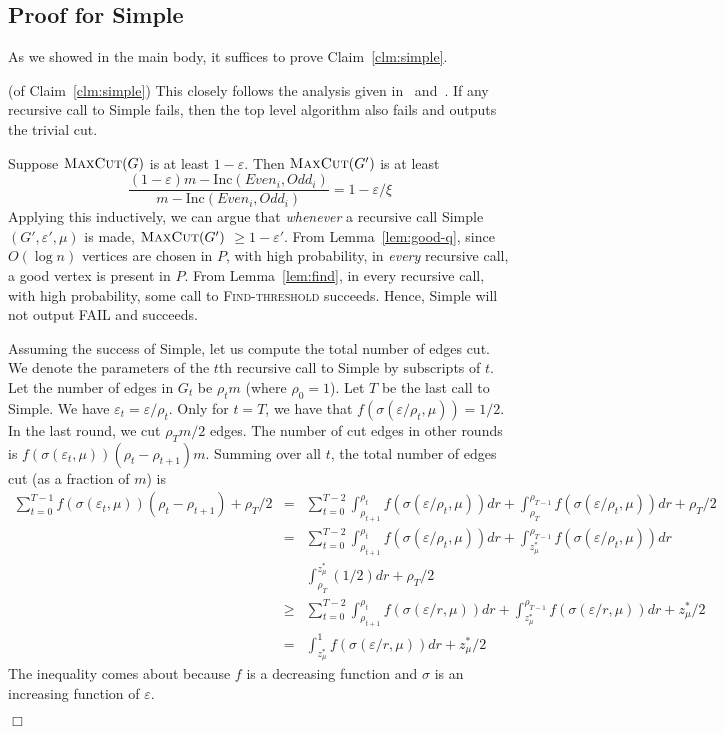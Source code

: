 \documentclass[11pt]{article}
\newenvironment{myproof}{\noindent {\sc Proof:}}{$\Box$}
\def\epsilon{\varepsilon}
\newcommand\inc{\textrm{Inc}}
\newcommand\Find{\textsc{Find-threshold}\xspace}
\newcommand\Simple{{\sc Simple}\xspace}
\newcommand\soto{f\xspace}
\def\maxcut{\textsc{MaxCut}\xspace}
\begin{document}
\subsection{Proof for {\Simple}}

As we showed in the main body, it suffices to prove
Claim~\ref{clm:simple}.

\begin{myproof} (of Claim~\ref{clm:simple}) This closely follows the analysis given
in~\cite{Tre09} and~\cite{Sot09}.
If any recursive call to \Simple fails, then the top
level algorithm also fails and outputs the trivial cut.

Suppose $\maxcut(G)$ is at least $1-\epsilon$.
Then $\maxcut(G')$ is at least
$$\frac{(1-\epsilon)m-\inc(Even_i,Odd_i)}{m-\inc(Even_i,Odd_i)}
= 1 - \epsilon/\xi $$
Applying this inductively, we can argue that \emph{whenever} a recursive call
{\Simple}$(G',\epsilon',\mu)$ is made, $\maxcut(G')$ $\geq 1-\epsilon'$.
From Lemma~\ref{lem:good-q}, since $O(\log n)$ vertices are chosen in $P$,
with high probability, in \emph{every} recursive call, a good vertex
is present in $P$. From Lemma~\ref{lem:find}, in every recursive call,
with high probability, some call to {\Find} succeeds. Hence, {\Simple} will
not output FAIL and succeeds.

Assuming the success of {\Simple}, let us compute the total number of edges cut. We denote the parameters of the $t$th
recursive call to {\Simple} by subscripts of $t$. Let the number of edges
in $G_t$ be $\rho_t m$ (where $\rho_0 = 1$). Let $T$ be the last call to {\Simple}.
We have $\epsilon_t = \epsilon/\rho_t$.
Only for $t = T$, we have that $\soto(\sigma(\epsilon/\rho_t,\mu)) = 1/2$.
In the last round, we cut
$\rho_T m/2$ edges.
The number of cut
edges in other rounds is $\soto(\sigma(\epsilon_t,\mu)) (\rho_t - \rho_{t+1}) m$.
Summing over all $t$, the total number of edges cut (as a fraction of $m$) is
\begin{eqnarray*}
	\sum_{t=0}^{T-1} \soto(\sigma(\epsilon_t,\mu)) (\rho_t - \rho_{t+1}) + \rho_T/2 & = &
	\sum_{t=0}^{T-2} \int_{\rho_{t+1}}^{\rho_t} \soto(\sigma(\epsilon/\rho_t,\mu)) dr +
	\int_{\rho_T}^{\rho_{T-1}} \soto(\sigma(\epsilon/\rho_t,\mu)) dr + \rho_T/2 \\
	& = & \sum_{t=0}^{T-2} \int_{\rho_{t+1}}^{\rho_t} \soto(\sigma(\epsilon/\rho_t,\mu)) dr +
	\int_{z_\mu^*}^{\rho_{T-1}} \soto(\sigma(\epsilon/\rho_t,\mu)) dr \\
	& & \int_{\rho_T}^{z_\mu^*} (1/2) dr + \rho_T/2 \\
	& \geq & \sum_{t=0}^{T-2} \int_{\rho_{t+1}}^{\rho_t} \soto(\sigma(\epsilon/r,\mu)) dr +
	\int_{z_\mu^*}^{\rho_{T-1}} \soto(\sigma(\epsilon/r,\mu)) dr + z_\mu^*/2 \\
	& = & \int_{z_\mu^*}^{1} \soto(\sigma(\epsilon/r,\mu)) dr	+ z_\mu^*/2
\end{eqnarray*}
The inequality comes about because $\soto$ is a decreasing function
and $\sigma$ is an increasing function of $\epsilon$.


\end{myproof}
\end{document}

